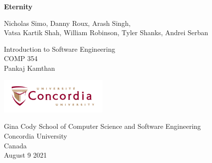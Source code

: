 \begin{titlepage}
   \begin{center}
       \vspace*{1cm}

       \Huge
       \textbf{Eternity}

        \vspace{0.5cm}
        \Large
        Nicholas Simo, Danny Roux, Arash Singh,
        \\Vatsa Kartik Shah, William Robinson, Tyler Shanks, Andrei Serban
       
       \vspace{6cm}
        Introduction to Software Engineering
        \\COMP 354
        \\Pankaj Kamthan

        
       \vspace{1.5cm}
        
        \Large

       \vfill
            
       \vspace{0.8cm}
     
       \includegraphics[width=0.4\textwidth]{images/concologo.png}

       Gina Cody School of Computer Science and Software Engineering\\
       Concordia University\\
       Canada\\
       August 9 2021
            
   \end{center}
\end{titlepage}